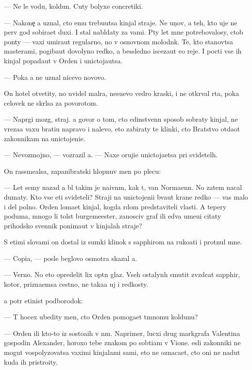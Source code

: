 \documentclass[10pt]{book}
\begin{document}
— Ne le{\y} vodu, koldun. Cuty bolyxe concretiki.

— Nakone{\c} {\y}a uznal, cto {\y}emu trebu{\y}utsa kinjal{\yi} straje{\y}. Ne {\y}un{\c}ov, a teh, kto uje ne perv{\yi}{\y} god sobira{\y}et duxi. I stal nabl{\io}daty za vami. P{\ia}ty let mne potrebovalosy, ctob{\yi} pon{\ia}ty — vaxi umira{\y}ut regularno, no v osnovnom molodn{\ia}k. Te, kto stanov{\ia}tsa masterami, pogiba{\y}ut dovolyno redko, a bessledno isceza{\y}ut {\y}e{\x}o reje. I pocti vse ih kinjal{\yi} popada{\y}ut v Orden i unictoja{\y}utsa.

— Poka {\y}a ne uznal nicevo novovo.

On hotel otvetity, no uvidel mal{\ia}ra, nesu{\x}evo vedro kraski, i ne otkr{\yi}val rta, poka celovek ne skr{\yi}lsa za povorotom.

— Napr{\ia}gi mozg, straj. {\Y}a govor{\io} o tom, cto {\y}edinstvenn{\yi}{\y} sposob sobraty kinjal{\yi}, ne v{\yi}reza{\y}a vaxu brati{\y}u napravo i nalevo, eto zabiraty te klinki, cto Bratstvo otda{\y}ot zakonnikam na unictojeni{\y}e.

— Nevozmojno, — vozrazil {\y}a. — Naxe oruji{\y}e unictoja{\y}etsa pri svidetel{\ia}h.

On rassme{\y}alsa, zapanibratski hlopnuv men{\ia} po plecu:

— Let semy nazad {\y}a b{\yi}l takim je naivn{\yi}m, kak t{\yi}, van Normaenn. No zatem nacal dumaty. Kto vse eti svideteli? Straji na unictojeni{\y}i b{\yi}va{\y}ut kra{\y}ne redko — vas malo i del polno. Orden loma{\y}et kinjal, kogda r{\ia}dom predstaviteli vlasti. A tepery poduma{\y}, mnogo li tolst{\yi}{\y} burgemeester, zanosciv{\yi}{\y} graf ili {\y}edva ume{\y}u{\x}i{\y} citaty prihodsko{\y} sv{\ia}{\x}ennik ponima{\y}ut v kinjalah straje{\y}?

S etimi slovami on dostal iz sumki klinok s sapphirom na ruko{\y}ati i prot{\ia}nul mne.

— Copi{\y}a, — posle beglovo osmotra skazal {\y}a.

— Verno. No eto opredelit lix op{\yi}tn{\yi}{\y} glaz. Vseh ostalyn{\yi}h smutit zv{\e}zdcat{\yi}{\y} sapphir, kotor{\yi}{\y}, prizna{\y}emsa cestno, ne taka{\y}a uj i redkosty.

{\Y}a pot{\e}r {\x}etinist{\yi}{\y} podborodok:

— T{\yi} hocex ubedity men{\ia}, cto Orden pomoga{\y}et t{\e}mnomu koldunu?

— Orden ili kto-to iz sosto{\y}a{\x}ih v n{\e}m. Naprimer, lucxi{\y} drug markgrafa Valentina gospodin Alexander, horoxo tebe znakom{\yi}{\y} po sob{\yi}ti{\y}am v Vione. {\Y}esli zakonniki ne mogut vospolyzovatsa vaximi kinjalami sami, eto ne oznaca{\y}et, cto oni ne na{\y}dut kuda ih pristro{\y}ity.
\end{document}
